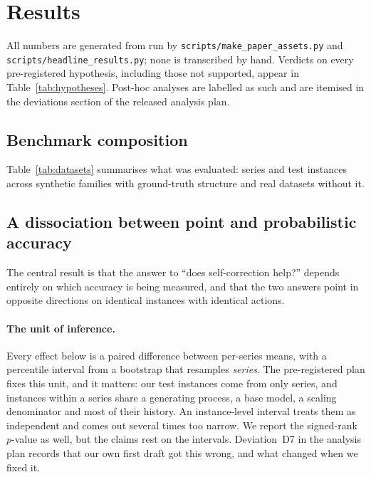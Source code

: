 \section{Results}
\label{sec:results}

All numbers are generated from run \texttt{\runid} by
\texttt{scripts/make\_paper\_assets.py} and \texttt{scripts/headline\_results.py}; none
is transcribed by hand. Verdicts on every pre-registered hypothesis, including those not
supported, appear in Table~\ref{tab:hypotheses}. Post-hoc analyses are labelled as such
and are itemised in the deviations section of the released analysis plan.

\subsection{Benchmark composition}

Table~\ref{tab:datasets} summarises what was evaluated: \nseries{} series and
\ntestinstances{} test instances across synthetic families with ground-truth structure
and real datasets without it.

\begin{table}[htbp]
\centering
\caption{Benchmark composition. Ground-truth structural labels exist only for synthetic
families; for real datasets the failure modes are derived rather than known.}
\label{tab:datasets}
\small
\fittable{}
\end{table}

\subsection{A dissociation between point and probabilistic accuracy}
\label{sec:headline}

The central result is that the answer to ``does self-correction help?'' depends entirely
on which accuracy is being measured, and that the two answers point in opposite
directions on identical instances with identical actions.

\paragraph{The unit of inference.}
Every effect below is a paired difference between per-series means, with a percentile
interval from a bootstrap that resamples \emph{series}. The pre-registered plan fixes
this unit, and it matters: our \ntestinstances{} test instances come from only
\nseries{} series, and instances within a series share a generating process, a base
model, a scaling denominator and most of their history. An instance-level interval
treats them as independent and comes out several times too narrow. We report the
signed-rank $p$-value as well, but the claims rest on the intervals. Deviation~D7 in the
analysis plan records that our own first draft got this wrong, and what changed when we
fixed it.

